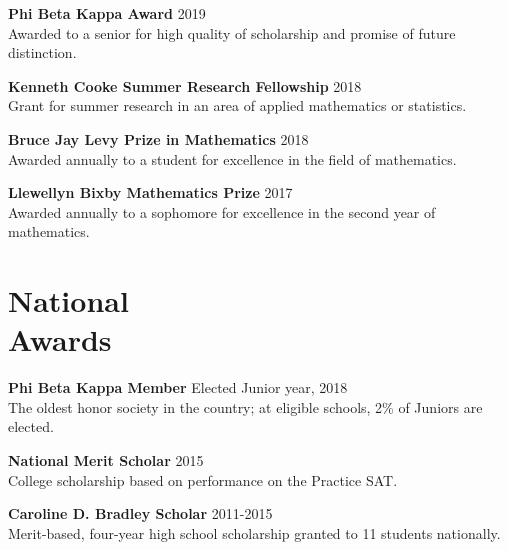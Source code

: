 \documentclass[margin]{res}
\begin{document}
\begin{resume}
\textbf{Phi Beta Kappa Award} \hfill 2019\\
Awarded to a senior for high quality of scholarship and promise of future distinction.

\textbf{Kenneth Cooke Summer Research Fellowship} \hfill 2018\\
Grant for summer research in an area of applied mathematics or statistics.

\textbf{Bruce Jay Levy Prize in Mathematics} \hfill 2018\\
Awarded annually to a student for excellence in the field of mathematics.

\textbf{Llewellyn Bixby Mathematics Prize} \hfill 2017\\
Awarded annually to a sophomore for excellence in the second year of mathematics.

\section{National \\Awards}
\textbf{Phi Beta Kappa Member} \hfill Elected Junior year, 2018\\
The oldest honor society in the country; at eligible schools, 2\% of Juniors are elected.

\textbf{National Merit Scholar} \hfill 2015\\
College scholarship based on performance on the Practice SAT.

\textbf{Caroline D. Bradley Scholar} \hfill 2011-2015\\
Merit-based, four-year high school scholarship granted to 11 students nationally.

\end{resume}
\end{document}

